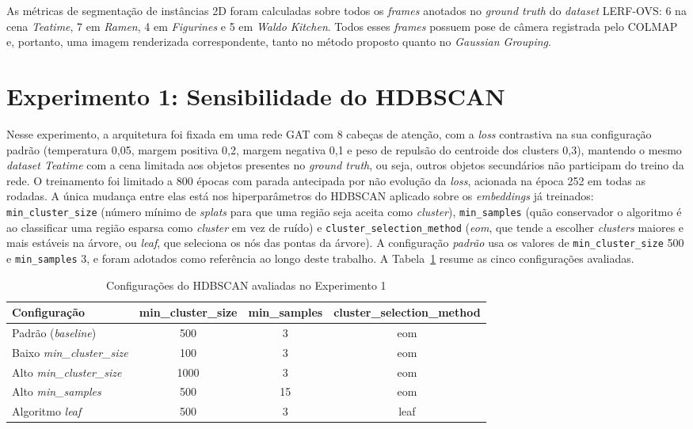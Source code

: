 As métricas de segmentação de instâncias 2D foram calculadas sobre todos os \textit{frames} anotados no \textit{ground truth} do \textit{dataset} LERF-OVS: 6 na cena \textit{Teatime}, 7 em \textit{Ramen}, 4 em \textit{Figurines} e 5 em \textit{Waldo Kitchen}. Todos esses \textit{frames} possuem pose de câmera registrada pelo COLMAP e, portanto, uma imagem renderizada correspondente, tanto no método proposto quanto no \textit{Gaussian Grouping}.

\section{Experimento 1: Sensibilidade do HDBSCAN}

Nesse experimento, a arquitetura foi fixada em uma rede GAT com 8 cabeças de atenção, com a \textit{loss} contrastiva na sua configuração padrão (temperatura 0,05, margem positiva 0,2, margem negativa 0,1 e peso de repulsão do centroide dos clusters 0,3), mantendo o mesmo \textit{dataset Teatime} com a cena limitada aos objetos presentes no \textit{ground truth}, ou seja, outros objetos secundários não participam do treino da rede. O treinamento foi limitado a 800 épocas com parada antecipada por não evolução da \textit{loss}, acionada na época 252 em todas as rodadas. A única mudança entre elas está nos hiperparâmetros do HDBSCAN aplicado sobre os \textit{embeddings} já treinados: \texttt{min\_cluster\_size} (número mínimo de \emph{splats} para que uma região seja aceita como \textit{cluster}), \texttt{min\_samples} (quão conservador o algoritmo é ao classificar uma região esparsa como \textit{cluster} em vez de ruído) e \texttt{cluster\_selection\_method} (\textit{eom}, que tende a escolher \textit{clusters} maiores e mais estáveis na árvore, ou \textit{leaf}, que seleciona os nós das pontas da árvore). A configuração \textit{padrão} usa os valores de \texttt{min\_cluster\_size} 500 e \texttt{min\_samples} 3, e foram adotados como referência ao longo deste trabalho. A Tabela~\ref{tab:config_experimento1} resume as cinco configurações avaliadas.


\begin{table}[h]
\centering
\caption{Configurações do HDBSCAN avaliadas no Experimento 1}
\label{tab:config_experimento1}
\begin{tabular}{lccc}
\hline
\textbf{Configuração} & \textbf{min\_cluster\_size} & \textbf{min\_samples} & \textbf{cluster\_selection\_method} \\
\hline
Padrão (\textit{baseline}) & 500 & 3 & eom \\
Baixo \textit{min\_cluster\_size} & 100 & 3 & eom \\
Alto \textit{min\_cluster\_size} & 1000 & 3 & eom \\
Alto \textit{min\_samples} & 500 & 15 & eom \\
Algoritmo \textit{leaf} & 500 & 3 & leaf \\
\hline
\end{tabular}
\end{table}


